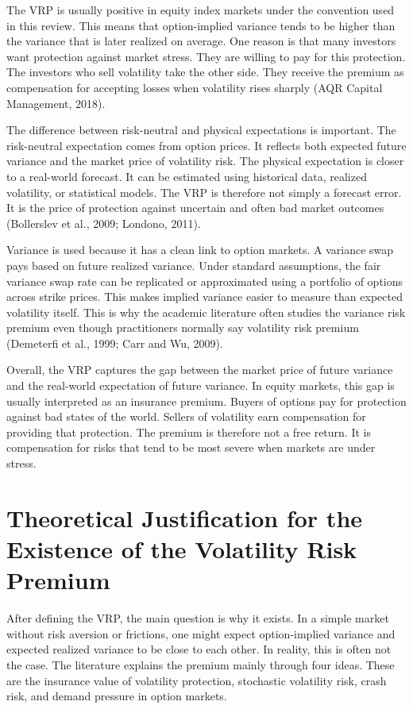 \documentclass[11pt,a4paper]{article}
\begin{document}
The VRP is usually positive in equity index markets under the convention used in this review. This means that option-implied variance tends to be higher than the variance that is later realized on average. One reason is that many investors want protection against market stress. They are willing to pay for this protection. The investors who sell volatility take the other side. They receive the premium as compensation for accepting losses when volatility rises sharply (AQR Capital Management, 2018).

The difference between risk-neutral and physical expectations is important. The risk-neutral expectation comes from option prices. It reflects both expected future variance and the market price of volatility risk. The physical expectation is closer to a real-world forecast. It can be estimated using historical data, realized volatility, or statistical models. The VRP is therefore not simply a forecast error. It is the price of protection against uncertain and often bad market outcomes (Bollerslev et al., 2009; Londono, 2011).

Variance is used because it has a clean link to option markets. A variance swap pays based on future realized variance. Under standard assumptions, the fair variance swap rate can be replicated or approximated using a portfolio of options across strike prices. This makes implied variance easier to measure than expected volatility itself. This is why the academic literature often studies the variance risk premium even though practitioners normally say volatility risk premium (Demeterfi et al., 1999; Carr and Wu, 2009).

Overall, the VRP captures the gap between the market price of future variance and the real-world expectation of future variance. In equity markets, this gap is usually interpreted as an insurance premium. Buyers of options pay for protection against bad states of the world. Sellers of volatility earn compensation for providing that protection. The premium is therefore not a free return. It is compensation for risks that tend to be most severe when markets are under stress.

\section{Theoretical Justification for the Existence of the Volatility Risk Premium}

After defining the VRP, the main question is why it exists. In a simple market without risk aversion or frictions, one might expect option-implied variance and expected realized variance to be close to each other. In reality, this is often not the case. The literature explains the premium mainly through four ideas. These are the insurance value of volatility protection, stochastic volatility risk, crash risk, and demand pressure in option markets.
\end{document}
